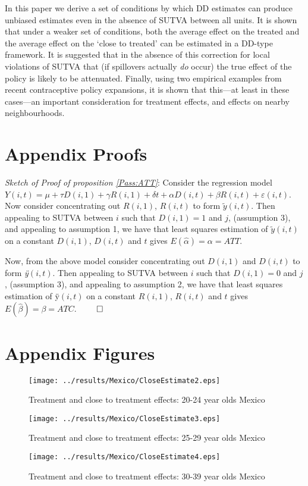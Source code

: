 \documentclass{article}
\begin{document}
\begin{spacing}{1.1}
In this paper we derive a set of conditions by which DD estimates can produce 
unbiased estimates even in the absence of SUTVA between all units.  It is shown
that under a weaker set of conditions, both the average effect on the treated
and the average effect on the `close to treated' can be estimated in a DD-type
framework.  It is suggested that in the absence of this correction for local 
violations of SUTVA that (if spillovers actually \emph{do} occur) the true 
effect of the policy is likely to be attenuated.  Finally, using two empirical 
examples from recent contraceptive policy expansions, it is shown that this---at
least in these cases---an important consideration for treatment effects, and
effects on nearby neighbourhoods.


\newpage

\newpage

\appendix
\section{Appendix Proofs}
\emph{Sketch of Proof of proposition \ref{Pass:ATT}}: Consider the regression 
model $Y(i,t)=\mu+\tau D(i,1) + \gamma R(i,1) + \delta t + \alpha D(i,t) + 
\beta R(i,t) + \varepsilon(i,t)$.  Now consider concentrating out $R(i,1)$, 
$R(i,t)$ to form $\tilde{y}(i,t)$.  Then appealing to SUTVA between $i$ such 
that $D(i,1)=1$ and $j$, (assumption 3), and appealing to assumption 1, we have 
that least squares estimation of $\tilde{y}(i,t)$ on a constant $D(i,1)$,
$D(i,t)$ and $t$ gives $E(\hat\alpha)=\alpha=ATT$.

Now, from the above model consider concentrating out $D(i,1)$ and $D(i,t)$
to form \emph{\"{y}}$(i,t)$.  Then appealing to SUTVA between $i$ such 
that $D(i,1)=0$ and $j$, (assumption 3), and appealing to assumption 2, we 
have that least squares estimation of \"{y}$(i,t)$ on a constant $R(i,1)$,
$R(i,t)$ and $t$ gives $E(\hat\beta)=\beta=ATC$. $\qed$



\section{Appendix Figures}
\label{Sscn:Agraphs}
\begin{figure}[htpb!]
\texttt{[image: ../results/Mexico/CloseEstimate2.eps]}
\caption{Treatment and close to treatment effects: 20-24 year olds Mexico}
\end{figure}
\begin{figure}[htpb!]
\texttt{[image: ../results/Mexico/CloseEstimate3.eps]}
\caption{Treatment and close to treatment effects: 25-29 year olds Mexico}
\end{figure}
\begin{figure}[htpb!]
\texttt{[image: ../results/Mexico/CloseEstimate4.eps]}
\caption{Treatment and close to treatment effects: 30-39 year olds Mexico}
\end{figure}


\end{spacing}
\end{document}
